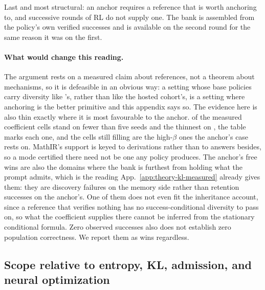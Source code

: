 \documentclass{article}
\newcommand{\1}{\mathbf 1}
\theoremstyle{remark}
\theoremstyle{definition}
\theoremstyle{plain}
\begin{document}
Last and most structural: an anchor requires a reference that is worth
anchoring to, and successive rounds of RL do not supply one. The bank is
assembled from the policy's own verified successes and is available on the
second round for the same reason it was on the first.

\paragraph{What would change this reading.}
The argument rests on a measured claim about references, not a theorem about
mechanisms, so it is defeasible in an obvious way: a setting whose base
policies carry diversity like \MDklWinDomain{}'s, rather than like the hosted
cohort's, is a setting where anchoring is the better primitive and this
appendix says so.
The evidence here is also thin exactly where it is most favourable to the
anchor. \MDklThinCells{} of the \MDklTotalCells{} measured coefficient cells
stand on fewer than five seeds and the thinnest on \MDklSeedsMin{}, the table
marks each one, and the cells still filling are the high-$\beta$ ones the
anchor's case rests on. MathIR's support is keyed to derivations rather than to
answers besides, so a mode certified there need not be one any policy produces.
The anchor's free wins are also the domains where the bank is furthest from
holding what the prompt admits, which is the reading
App.~\ref{app:theory-kl-measured} already gives them: they are discovery
failures on the memory side rather than retention successes on the anchor's.
One of them does not even fit the inheritance account, since a reference that
verifies nothing has no success-conditional diversity to pass on, so what the
coefficient supplies there cannot be inferred from the stationary
conditional formula. Zero observed successes also does not establish
zero population correctness. We report them as wins regardless.

\subsection{Scope relative to entropy, KL, admission, and neural optimization}
\label{app:theory-entropy}
\label{app:theory-entropy-comparison}
\end{document}
